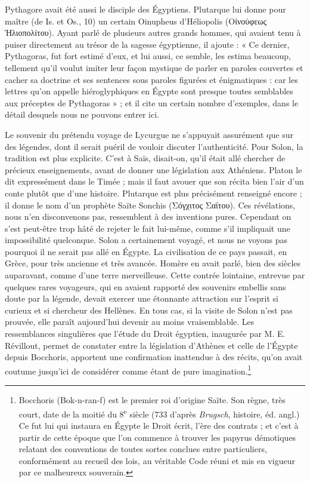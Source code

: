 \documentclass[a4paper, 11pt, oneside]{article}
\begin{document}
Pythagore avait été aussi le disciple des Égyptiens. Plutarque lui donne pour maître (de Is. et Os., 10) un certain Oinupheus d'Héliopolis (Οἰνούφεως Ἡλιοπολίτου). Ayant parlé de plusieurs autres grands hommes, qui avaient tenu à puiser directement au trésor de la sagesse égyptienne, il ajoute : « Ce dernier, Pythagoras, fut fort estimé d'eux, et lui aussi, ce semble, les estima beaucoup, tellement qu'il voulut imiter leur façon mystique de parler en paroles couvertes et cacher sa doctrine et ses sentences sous paroles figurées et énigmatiques : car les lettres qu'on appelle hiéroglyphiques en Égypte sont presque toutes semblables aux préceptes de Pythagoras » ; et il cite un certain nombre d'exemples, dans le détail desquels nous ne pouvons entrer ici.

Le souvenir du prétendu voyage de Lycurgue ne s'appuyait assurément que sur des légendes, dont il serait puéril de vouloir discuter l'authenticité. Pour Solon, la tradition est plus explicite. C'est à Saïs, disait-on, qu'il était allé chercher de précieux enseignements, avant de donner une législation aux Athéniens. Platon le dit expressément dans le Timée ; mais il faut avouer que son récita bien l'air d'un conte plutôt que d'une histoire. Plutarque est plus précisément renseigné encore ; il donne le nom d'un prophète Saïte Sonchis (Σόγχιτος Σαϊτου). Ces révélations, nous n'en disconvenons pas, ressemblent à des inventions pures. Cependant on s'est peut-être trop hâté de rejeter le fait lui-même, comme s'il impliquait une impossibilité quelconque. Solon a certainement voyagé, et nous ne voyons pas pourquoi il ne serait pas allé en Égypte. La civilisation de ce pays passait, en Grèce, pour très ancienne et très avancée. Homère en avait parlé, bien des siècles auparavant, comme d'une terre merveilleuse. Cette contrée lointaine, entrevue par quelques rares voyageurs, qui en avaient rapporté des souvenirs embellis sans doute par la légende, devait exercer une étonnante attraction sur l'esprit si curieux et si chercheur des Hellènes. En tous cas, si la visite de Solon n'est pas prouvée, elle paraît aujourd'hui devenir au moins vraisemblable. Les ressemblances singulières que l'étude du Droit égyptien, inaugurée par M. E. Révillout, permet de constater entre la législation d'Athènes et celle de l'Égypte depuis Bocchoris, apportent une confirmation inattendue à des récits, qu'on avait coutume jusqu'ici de considérer comme étant de pure imagination.\footnote{Bocchoris (Bok-n-ran-f) est le premier roi d'origine Saïte. Son règne, très court, date de la moitié du 8\textsuperscript{e} siècle (733 d'après \emph{Brugsch}, histoire, éd. angl.) Ce fut lui qui instaura en Égypte le Droit écrit, l'ère des contrats ; et c'est à partir de cette époque que l'on commence à trouver les papyrus démotiques relatant des conventions de toutes sortes conclues entre particuliers, conformément au recueil des lois, au véritable Code réuni et mis en vigueur par ce malheureux souverain.}
\end{document}
